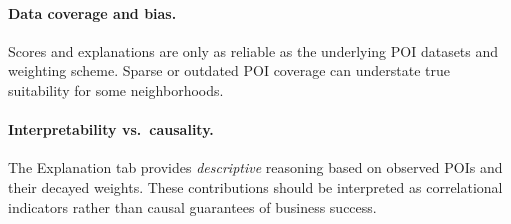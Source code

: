 \paragraph{Data coverage and bias.}
Scores and explanations are only as reliable as the underlying POI datasets and weighting scheme. Sparse or outdated POI coverage can understate true suitability for some neighborhoods.

\paragraph{Interpretability vs.\ causality.}
The Explanation tab provides \emph{descriptive} reasoning based on observed POIs and their decayed weights. These contributions should be interpreted as correlational indicators rather than causal guarantees of business success.





